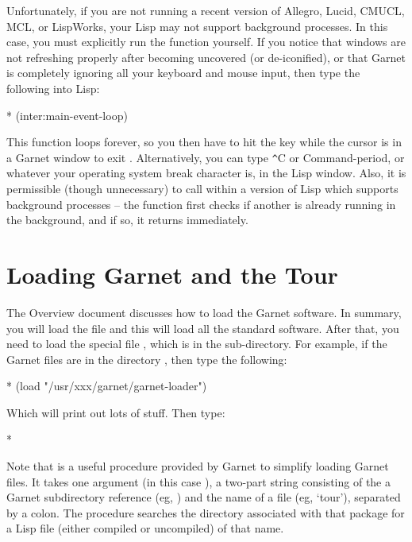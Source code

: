 Unfortunately, if you are not running a recent version of Allegro,
Lucid, CMUCL, MCL, or LispWorks, your Lisp may not support background
processes. In this case, you must explicitly run
the function yourself.  If you notice that windows are not refreshing
properly after becoming uncovered (or de-iconified), or that Garnet is
completely ignoring all your keyboard and mouse input, then type the
following into Lisp:
\begin{programexample}
* (inter:main-event-loop)
\end{programexample}
This function loops forever, so you then have to hit the
 key while the cursor is in a Garnet window to exit
.  Alternatively, you can type {\texttt \^}C or Command-period,
or whatever your operating system break character is,
in the Lisp window.  Also, it is permissible (though unnecessary) to call
 within a version of Lisp which supports background
processes -- the function first checks if another 
is already running in the background, and if so, it returns immediately.


\section{Loading Garnet and the Tour}

The Overview document discusses how to load the Garnet software.  In
summary, you will load the file  and this will load all
the standard software.  After that, you need to load the special file
, which is in the  sub-directory.
For example, if the Garnet files are in the directory
, then type the following:

\begin{programexample}
* (load "/usr/xxx/garnet/garnet-loader")
\end{programexample}
Which will print out lots of stuff.  Then type:
\begin{programexample}
* 
\end{programexample}
Note that  is a useful procedure
provided by Garnet to simplify loading Garnet files.  It takes one
argument (in this case ), a two-part string consisting of
the a Garnet subdirectory reference (eg, ) and
the name of a file (eg, `tour'), separated by a colon.  The procedure
searches the directory associated with that package for a Lisp file (either
compiled or uncompiled) of that name.



